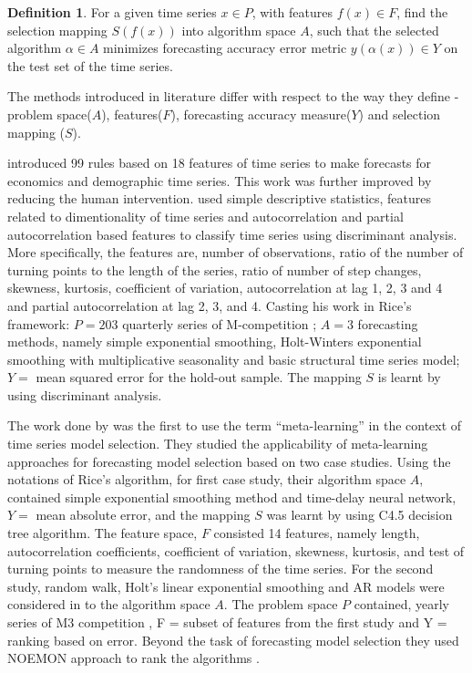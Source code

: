 \documentclass[11pt,a4paper,]{article}
\theoremstyle{definition}
\newtheorem{definition}{Definition}[section]
\theoremstyle{definition}
\theoremstyle{definition}
\theoremstyle{remark}
\begin{document}
\begin{definition}
\label{def2}
For a given time series $x \in P$, with features $f(x) \in F$, find the selection mapping $S(f(x))$ into algorithm space $A$, such that the selected algorithm $\alpha \in A$ minimizes forecasting accuracy error metric $y(\alpha(x)) \in Y$ on the test set of the time series.
\end{definition}

The methods introduced in literature differ with respect to the way they
define - problem space(\(A\)), features(\(F\)), forecasting accuracy
measure(\(Y\)) and selection mapping (\(S\)).

\textcite{collopy1992rule} introduced 99 rules based on 18 features of
time series to make forecasts for economics and demographic time series.
This work was further improved by \textcite{armstrong2001s} reducing the
human intervention. \textcite{shah1997model} used simple descriptive
statistics, features related to dimentionality of time series and
autocorrelation and partial autocorrelation based features to classify
time series using discriminant analysis. More specifically, the features
are, number of observations, ratio of the number of turning points to
the length of the series, ratio of number of step changes, skewness,
kurtosis, coefficient of variation, autocorrelation at lag 1, 2, 3 and 4
and partial autocorrelation at lag 2, 3, and 4. Casting his work in
Rice's framework: \(P=203\) quarterly series of M-competition
\autocite{makridakis1982accuracy}; \(A=3\) forecasting methods, namely
simple exponential smoothing, Holt-Winters exponential smoothing with
multiplicative seasonality and basic structural time series model;
\(Y=\) mean squared error for the hold-out sample. The mapping \(S\) is
learnt by using discriminant analysis.

The work done by \textcite{prudencio2004meta} was the first to use the
term ``meta-learning'' in the context of time series model selection.
They studied the applicability of meta-learning approaches for
forecasting model selection based on two case studies. Using the
notations of Rice's algorithm, for first case study, their algorithm
space \(A\), contained simple exponential smoothing method and
time-delay neural network, \(Y=\) mean absolute error, and the mapping
\(S\) was learnt by using C4.5 decision tree algorithm. The feature
space, \(F\) consisted 14 features, namely length, autocorrelation
coefficients, coefficient of variation, skewness, kurtosis, and test of
turning points to measure the randomness of the time series. For the
second study, random walk, Holt's linear exponential smoothing and AR
models were considered in to the algorithm space \(A\). The problem
space \(P\) contained, yearly series of M3 competition
\autocite{makridakis2000m3}, F = subset of features from the first study
and Y = ranking based on error. Beyond the task of forecasting model
selection they used NOEMON approach to rank the algorithms
\autocite{kalousis1999noemon}.
\end{document}
